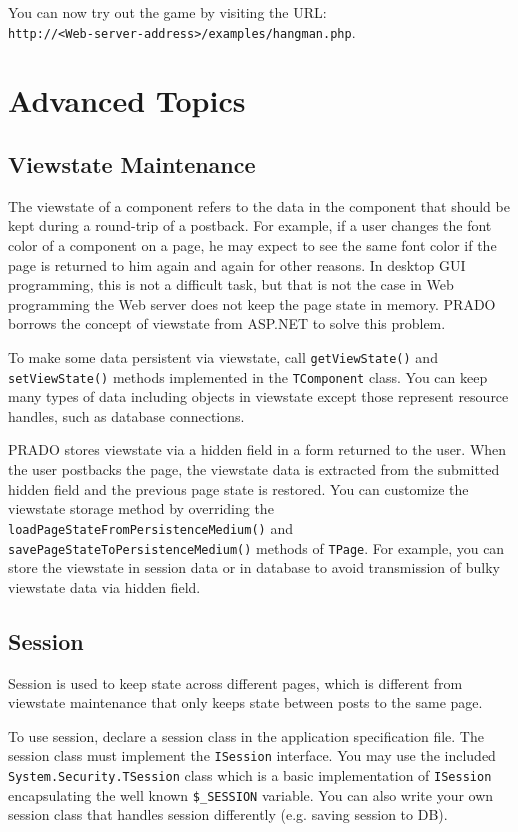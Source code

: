 \documentclass{book}
\begin{document}
You can now try out the game by visiting the URL:\\
\verb|http://<Web-server-address>/examples/hangman.php|.


\chapter{Advanced Topics}

\section{Viewstate Maintenance}

The viewstate of a component refers to the data in the component
that should be kept during a round-trip of a postback. For
example, if a user changes the font color of a component on a
page, he may expect to see the same font color if the page is
returned to him again and again for other reasons. In desktop GUI
programming, this is not a difficult task, but that is not the
case in Web programming the Web server does not keep the page
state in memory. PRADO borrows the concept of viewstate from
ASP.NET to solve this problem.


To make some data persistent via viewstate, call
\verb|getViewState()| and \verb|setViewState()| methods
implemented in the \verb|TComponent| class. You can keep many
types of data including objects in viewstate except those
represent resource handles, such as database connections.


PRADO stores viewstate via a hidden field in a form returned to
the user. When the user postbacks the page, the viewstate data is
extracted from the submitted hidden field and the previous page
state is restored. You can customize the viewstate storage method
by overriding the \verb|loadPageStateFromPersistenceMedium()| and
\verb|savePageStateToPersistenceMedium()| methods of \verb|TPage|.
For example, you can store the viewstate in session data or in
database to avoid transmission of bulky viewstate data via hidden
field.


\section{Session}

Session is used to keep state across different pages, which is
different from viewstate maintenance that only keeps state between
posts to the same page.

To use session, declare a session class in the application
specification file. The session class must implement the
\verb|ISession| interface. You may use the included
\verb|System.Security.TSession| class which is a basic
implementation of \verb|ISession| encapsulating the well known
\verb|$_SESSION| variable. You can also write your own session
class that handles session differently (e.g. saving session to
DB).
\end{document}
